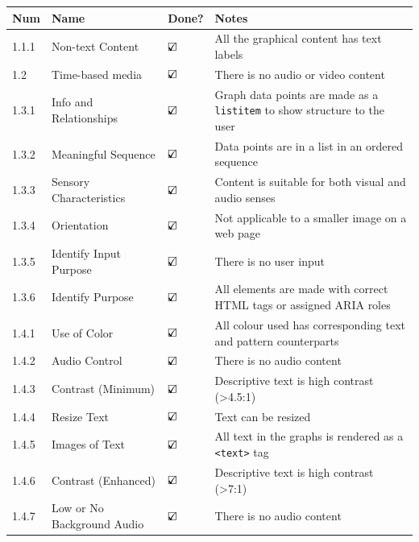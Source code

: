 \documentclass[ %
                    author={Aleena Baig},
                supervisor={Dr Simon Lock},
                    degree={BSc},
                     title={On Making Web Accessible Graphs},
                  subtitle={},
                      year={2019} ]{dissertation}
\begin{document}
\begin{center}
\begin{longtable}{|p{2cm}|p{5cm}|p{2cm}|p{5cm}|}
 \hline
 Num & Name & Done? & Notes \\ [0.5ex]
 \hline \hline
 1.1.1 & Non-text Content & $\text{\rlap{$\checkmark$}}\square$ & All the graphical content has text labels\\
 \hline
 1.2 & Time-based media & $\text{\rlap{$\checkmark$}}\square$ & There is no audio or video content\\
 \hline
 1.3.1 & Info and Relationships & $\text{\rlap{$\checkmark$}}\square$ & Graph data points are made as a \texttt{listitem} to show structure to the user\\
 \hline
 1.3.2 & Meaningful Sequence & $\text{\rlap{$\checkmark$}}\square$ & Data points are in a list in an ordered sequence\\
 \hline
 1.3.3 & Sensory Characteristics & $\text{\rlap{$\checkmark$}}\square$ & Content is suitable for both visual and audio senses\\
 \hline
 1.3.4 & Orientation & $\text{\rlap{$\checkmark$}}\square$ & Not applicable to a smaller image on a web page\\
 \hline
 1.3.5 & Identify Input Purpose & $\text{\rlap{$\checkmark$}}\square$ & There is no user input\\
 \hline
 1.3.6 & Identify Purpose & $\text{\rlap{$\checkmark$}}\square$ & All elements are made with correct HTML tags or assigned ARIA roles\\
 \hline
 1.4.1 & Use of Color & $\text{\rlap{$\checkmark$}}\square$ & All colour used has corresponding text and pattern counterparts\\
 \hline
 1.4.2 & Audio Control & $\text{\rlap{$\checkmark$}}\square$ & There is no audio content\\
 \hline
 1.4.3 & Contrast (Minimum) & $\text{\rlap{$\checkmark$}}\square$ & Descriptive text is high contrast (\textgreater 4.5:1)\\
 \hline
 1.4.4 & Resize Text & $\text{\rlap{$\checkmark$}}\square$ & Text can be resized\\
 \hline
 1.4.5 & Images of Text & $\text{\rlap{$\checkmark$}}\square$ & All text in the graphs is rendered as a \texttt{<text>} tag\\
 \hline
 1.4.6 & Contrast (Enhanced) & $\text{\rlap{$\checkmark$}}\square$ & Descriptive text is high contrast (\textgreater 7:1)\\
 \hline
 1.4.7 & Low or No Background Audio & $\text{\rlap{$\checkmark$}}\square$ & There is no audio content\\

\end{longtable}
\end{center}
\end{document}
